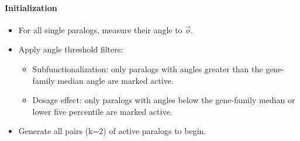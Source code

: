 \documentclass{article}
\begin{document}
\paragraph{Initialization}
\begin{itemize}
    \item For all single paralogs, measure their angle to $\vec{o}$.
    \item Apply angle threshold filters:
    \begin{itemize}
        \item Subfunctionalization: only paralogs with angles greater than the gene-family median angle are marked active.
        \item Dosage effect: only paralogs with angles below the gene-family median or lower five percentile are marked active.
    \end{itemize}
    \item Generate all pairs (k=2) of active paralogs to begin.
\end{itemize}
\end{document}
